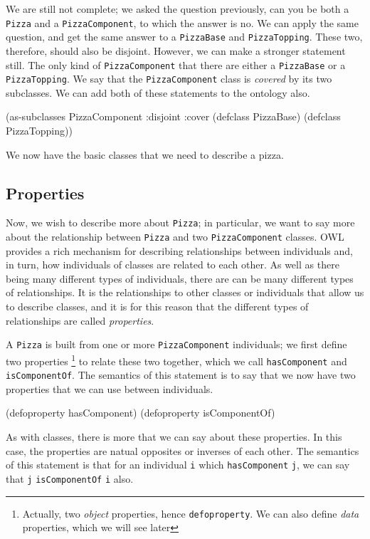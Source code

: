 \documentclass[11pt]{article}
\begin{document}
We are still not complete; we asked the question previously, can you be both a
\verb~Pizza~ and a \verb~PizzaComponent~, to which the answer is no. We can apply the
same question, and get the same answer to a \verb~PizzaBase~ and \verb~PizzaTopping~.
These two, therefore, should also be disjoint. However, we can make a stronger
statement still. The only kind of \verb~PizzaComponent~ that there are either a
\verb~PizzaBase~ or a \verb~PizzaTopping~. We say that the \verb~PizzaComponent~ class is
\emph{covered} by its two subclasses. We can add both of these statements to the
ontology also.

\begin{tawny}
(as-subclasses
 PizzaComponent
 :disjoint :cover
 (defclass PizzaBase)
 (defclass PizzaTopping))
\end{tawny}

We now have the basic classes that we need to describe a pizza.

\subsection{Properties}
\label{sec-5-2}

Now, we wish to describe more about \verb~Pizza~; in particular, we want to say
more about the relationship between \verb~Pizza~ and two \verb~PizzaComponent~ classes.
OWL provides a rich mechanism for describing relationships between individuals
and, in turn, how individuals of classes are related to each other. As well as
there being many different types of individuals, there are can be many
different types of relationships. It is the relationships to other classes or
individuals that allow us to describe classes, and it is for this reason that
the different types of relationships are called \emph{properties}.

A \verb~Pizza~ is built from one or more \verb~PizzaComponent~ individuals; we first
define two properties \footnote{Actually, two \emph{object} properties, hence
\verb~defoproperty~. We can also define \emph{data} properties, which we will see later}
to relate these two together, which we call \verb~hasComponent~ and
\verb~isComponentOf~. The semantics of this statement is to say that we now have
two properties that we can use between individuals.

\begin{tawny}
(defoproperty hasComponent)
(defoproperty isComponentOf)
\end{tawny}

As with classes, there is more that we can say about these properties. In this
case, the properties are natual opposites or inverses of each other. The
semantics of this statement is that for an individual \verb~i~ which \verb~hasComponent~
\verb~j~, we can say that \verb~j~ \verb~isComponentOf~ \verb~i~ also. 
\end{document}
